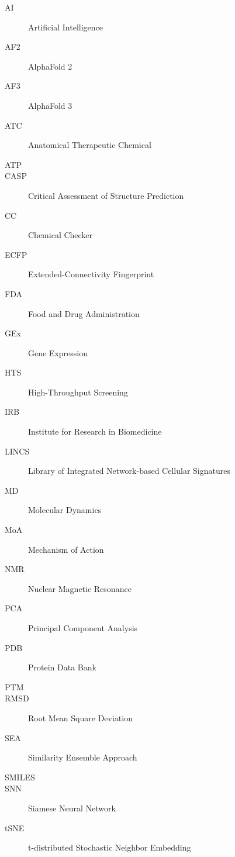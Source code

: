 

\begin{description}
    \item[AI] Artificial Intelligence
    \item[AF2] AlphaFold 2
    \item[AF3] AlphaFold 3
    \item[ATC] Anatomical Therapeutic Chemical
    \item[ATP]
    \item[CASP] Critical Assessment of Structure Prediction 
    \item[CC] Chemical Checker
    \item[ECFP] Extended-Connectivity Fingerprint
    \item[FDA] Food and Drug Administration
    \item[GEx] Gene Expression
    \item[HTS] High-Throughput Screening
    \item[IRB] Institute for Research in Biomedicine 
    \item[LINCS] Library of Integrated Network-based Cellular Signatures
    \item[MD] Molecular Dynamics
    \item[MoA] Mechanism of Action
    \item[NMR] Nuclear Magnetic Resonance
    \item[PCA] Principal Component Analysis
    \item[PDB] Protein Data Bank
    \item[PTM] 
    \item[RMSD] Root Mean Square Deviation
    \item[SEA] Similarity Ensemble Approach
    \item[SMILES] 
    \item[SNN] Siamese Neural Network
    \item[tSNE] t-distributed Stochastic Neighbor Embedding
\end{description}

